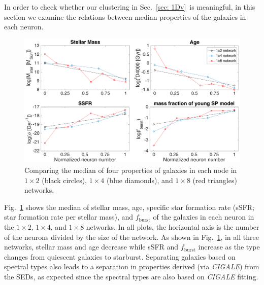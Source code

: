        In order to check whether our clustering in Sec.~\ref{sec: 1Dv}~is meaningful, in this section we examine the relations between median properties of the galaxies in each neuron. 
        
        \begin{figure}
            \centering
            \includegraphics[width=\textwidth]{images0.01/1d/props5.png}
            \caption[The median of four properties of galaxies in three networks]{Comparing the median of four properties of galaxies in each node in $1\times2$ (black circles), $1\times4$ (blue diamonds), and $1\times8$ (red triangles) networks.}
            \label{fig: props}
        \end{figure}
       
        Fig.~\ref{fig: props} shows the median of stellar mass, age, specific star formation rate (sSFR; star formation rate per stellar mass), and $f_\mathrm{burst}$ of the galaxies in each neuron in the $1\times2$, $1\times4$, and $1\times8$ networks.
        In all plots, the horizontal axis is the number of the neurons divided by the size of the network.
        As shown in Fig.~\ref{fig: props}, in all three networks, stellar mass and age decrease while sSFR and $f_\mathrm{burst}$ increase as the type changes from quiescent galaxies to starburst.
       Separating galaxies based on spectral types also leads to a separation in properties derived (via {\em CIGALE}) from the SEDs, as expected since the spectral types are also based on {\em CIGALE} fitting. 
    

